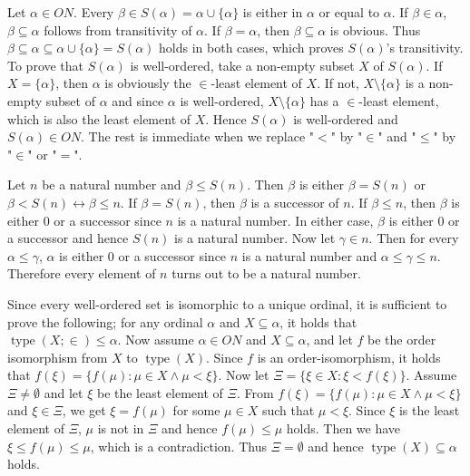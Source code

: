\documentclass[12pt]{article}
\newcommand{\type}{\mathop{\mathrm{type}}}
\theoremstyle{definition}
\newenvironment{customthm}[1]
  {\renewcommand\theinnercustomthm{#1}\innercustomthm}
  {\endinnercustomthm}
\begin{document}
\begin{customthm}{I.8.11} Let $\alpha\in ON$. Every $\beta\in S(\alpha)=\alpha\cup\{\alpha\}$ is either in $\alpha$ or equal to $\alpha$. If $\beta\in\alpha$, $\beta\subseteq\alpha$ follows from transitivity of $\alpha$. If $\beta=\alpha$, then $\beta\subseteq \alpha$ is obvious. Thus $\beta\subseteq\alpha\subseteq\alpha\cup\{\alpha\}=S(\alpha)$ holds in both cases, which proves $S(\alpha)$'s transitivity. To prove that $S(\alpha)$ is well-ordered, take a non-empty subset $X$ of $S(\alpha)$. If $X=\{\alpha\}$, then $\alpha$ is obviously the $\in$-least element of $X$. If not, $X\setminus\{\alpha\}$ is a non-empty subset of $\alpha$ and since $\alpha$ is well-ordered, $X\setminus\{\alpha\}$ has a $\in$-least element, which is also the least element of $X$. Hence $S(\alpha)$ is well-ordered and $S(\alpha)\in ON$. The rest is immediate when we replace "$<$" by "$\in$" and "$\leq$" by "$\in$" or "$=$".
\end{customthm}

\begin{customthm}{I.8.13} Let $n$ be a natural number and $\beta\leq S(n)$. Then $\beta$ is either $\beta=S(n)$ or $\beta<S(n)\leftrightarrow\beta\leq n$. If $\beta=S(n)$, then $\beta$ is a successor of $n$. If $\beta\leq n$, then $\beta$ is either 0 or a successor since $n$ is a natural number. In either case, $\beta$ is either 0 or a successor and hence $S(n)$ is a natural number. Now let $\gamma\in n$. Then for every $\alpha\leq\gamma$, $\alpha$ is either 0 or a successor since $n$ is a natural number and $\alpha\leq\gamma\leq n$. Therefore every element of $n$ turns out to be a natural number.
\end{customthm}

\begin{customthm}{I.8.22} Since every well-ordered set is isomorphic to a unique ordinal, it is sufficient to prove the following; for any ordinal $\alpha$ and $X\subseteq\alpha$, it holds that $\type(X;\in)\leq\alpha$. Now assume $\alpha\in ON$ and  $X\subseteq\alpha$, and let $f$ be the order isomorphism from $X$ to $\type(X)$. Since $f$ is an order-isomorphism, it holds that $f(\xi)=\{f(\mu):\mu\in X\wedge\mu<\xi\}$. Now let $\Xi = \{\xi\in X:\xi<f(\xi)\}$. Assume $\Xi\neq\emptyset$ and let $\xi$ be the least element of $\Xi$. From $f(\xi)=\{f(\mu):\mu\in X\wedge\mu<\xi\}$ and $\xi\in\Xi$, we get $\xi=f(\mu)$ for some $\mu\in X$ such that $\mu<\xi$. Since $\xi$ is the least element of $\Xi$, $\mu$ is not in $\Xi$ and hence $f(\mu)\leq\mu$ holds. Then we have $\xi\leq f(\mu)\leq\mu$, which is a contradiction. Thus $\Xi=\emptyset$ and hence $\type(X)\subseteq\alpha$ holds.
\end{customthm}
\end{document}

